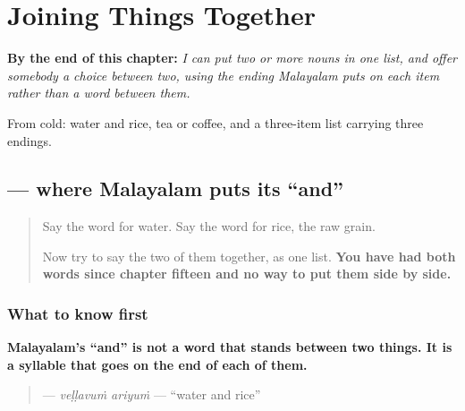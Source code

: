 
\chapter{Joining Things Together}
\label{ch:ml-cherkkuka}

\begin{chapteropening}
\textbf{By the end of this chapter:} \emph{I can put two or more nouns in one list, and offer somebody a choice between two, using the ending Malayalam puts on each item rather than a word between them.}

From cold: water and rice, tea or coffee, and a three-item list carrying three endings.
\end{chapteropening}

\section[\texorpdfstring{\ml{വെള്ളവും} \ml{അരിയും} (veḷḷavuṁ ariyuṁ)}{വെള്ളവും അരിയും (veḷḷavuṁ ariyuṁ)}]{  — where Malayalam puts its \textquotedblleft{}and\textquotedblright{}}

\label{lesson:ML-C70-um}



\begin{quote}
Say the word for water. Say the word for rice, the raw grain.

Now try to say the two of them together, as one list. \textbf{You have had both words since chapter fifteen and no way to put them side by side.}
\end{quote}

\subsection*{What to know first}
\textbf{Malayalam's \textquotedblleft{}and\textquotedblright{} is not a word that stands between two things. It is a syllable that goes on the end of each of them.}

\begin{quote}
\textbf{ } — \emph{veḷḷavuṁ ariyuṁ} — \textquotedblleft{}water and rice\textquotedblright{}
\end{quote}

